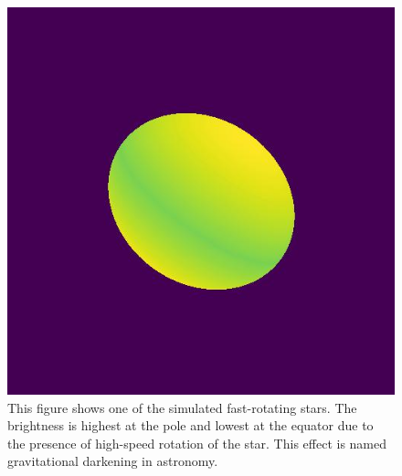 \begin{figure}
	\centering
	\includegraphics[width=0.8\linewidth]{fig/ellipse/ellipse6018.jpg}
	\caption{This figure shows one of the simulated fast-rotating stars. The brightness is highest at the pole and lowest at the equator due to the presence of high-speed rotation of the star. This effect is named gravitational darkening in astronomy.}
	\label{fig:image}
\end{figure}

